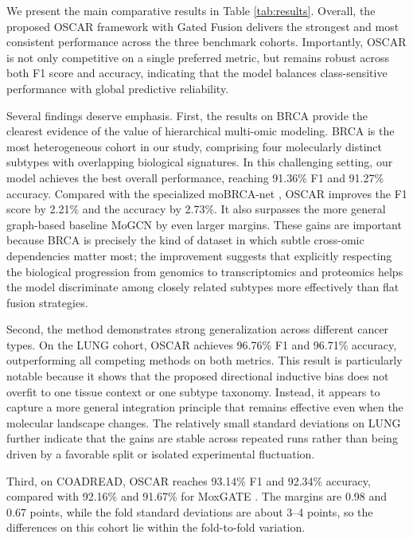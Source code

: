 \documentclass[lettersize,journal]{IEEEtran}
\begin{document}
We present the main comparative results in Table \ref{tab:results}. Overall, the proposed OSCAR framework with Gated Fusion delivers the strongest and most consistent performance across the three benchmark cohorts. Importantly, OSCAR is not only competitive on a single preferred metric, but remains robust across both F1 score and accuracy, indicating that the model balances class-sensitive performance with global predictive reliability.



Several findings deserve emphasis. First, the results on BRCA provide the clearest evidence of the value of hierarchical multi-omic modeling. BRCA is the most heterogeneous cohort in our study, comprising four molecularly distinct subtypes with overlapping biological signatures. In this challenging setting, our model achieves the best overall performance, reaching 91.36\% F1 and 91.27\% accuracy. Compared with the specialized moBRCA-net \cite{moBRCAnat2023}, OSCAR improves the F1 score by 2.21\% and the accuracy by 2.73\%. It also surpasses the more general graph-based baseline MoGCN \cite{MoGCN2022} by even larger margins. These gains are important because BRCA is precisely the kind of dataset in which subtle cross-omic dependencies matter most; the improvement suggests that explicitly respecting the biological progression from genomics to transcriptomics and proteomics helps the model discriminate among closely related subtypes more effectively than flat fusion strategies.

Second, the method demonstrates strong generalization across different cancer types. On the LUNG cohort, OSCAR achieves 96.76\% F1 and 96.71\% accuracy, outperforming all competing methods on both metrics. This result is particularly notable because it shows that the proposed directional inductive bias does not overfit to one tissue context or one subtype taxonomy. Instead, it appears to capture a more general integration principle that remains effective even when the molecular landscape changes. The relatively small standard deviations on LUNG further indicate that the gains are stable across repeated runs rather than being driven by a favorable split or isolated experimental fluctuation.

Third, on COADREAD, OSCAR reaches 93.14\% F1 and 92.34\% accuracy, compared with 92.16\% and 91.67\% for MoxGATE \cite{MoxGATE2023}. The margins are 0.98 and 0.67 points, while the fold standard deviations are about 3--4 points, so the differences on this cohort lie within the fold-to-fold variation.
\end{document}
